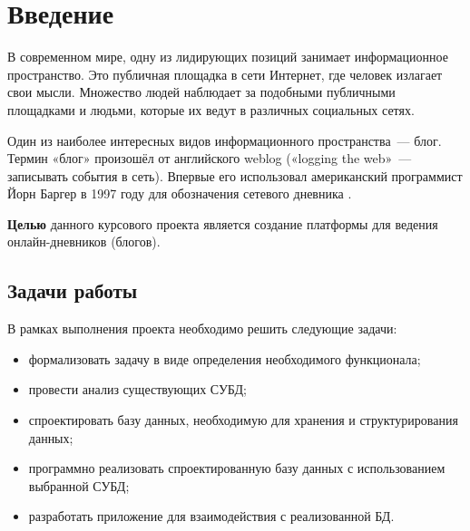 \chapter*{Введение}

В современном мире, одну из лидирующих позиций занимает информационное пространство.
Это публичная площадка в сети Интернет, где человек излагает свои мысли.
Множество людей наблюдает за подобными публичными площадками и людьми, которые их ведут в различных социальных сетях.

Один из наиболее интересных видов информационного пространства~— блог.
Термин «блог» произошёл от английского weblog («logging the web»~— записывать события в сеть).
Впервые его использовал американский программист Йорн Баргер в 1997 году для обозначения сетевого дневника \cite{lagoshina}.

\textbf{Целью} данного курсового проекта является создание платформы для ведения онлайн-дневников (блогов).

\section*{Задачи работы}

В рамках выполнения проекта необходимо решить следующие задачи:
\begin{itemize}
	\item формализовать задачу в виде определения необходимого функционала;
	\item провести анализ существующих СУБД;
	\item спроектировать базу данных, необходимую для хранения и структурирования данных;
	\item программно реализовать спроектированную базу данных с использованием выбранной СУБД;
	\item разработать приложение для взаимодействия с реализованной БД.
\end{itemize}
